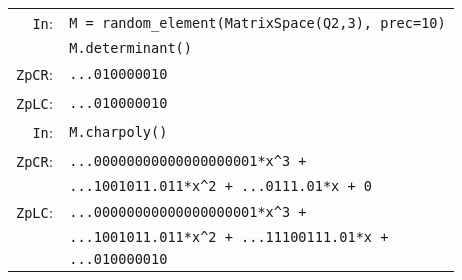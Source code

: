 \documentclass[sigconf]{acmart}
\newcommand{\cIn}{{\color{input} \tt \phantom{Zp}In}:}
\newcommand{\cZpCR}{{\color{output} \tt ZpCR}:}
\newcommand{\cZpFP}{{\color{output} \tt ZpFP}:}
\newcommand{\cZpLC}{{\color{output} \tt ZpLC}:}
\newcommand{\cZpLF}{{\color{output} \tt ZpLF}:}
\theoremstyle{definition}
\begin{document}
\smallskip

{\noindent \small
\begin{tabular}{rl}
\cIn
 & \verb?M = ?{\color{function}\verb?random_element?}\verb?(?{\color{constructor}\verb?MatrixSpace?}\verb?(?{\color{ring}\verb?Q2?}\verb?,3), prec=10)? \\
 & \verb?M.?{\color{method}\verb?determinant?}\verb?()? \\
\cZpCR
 & \verb?...010000010? \\
\cZpLC
 & \verb?...010000010? \\
\cIn
 & \verb?M.?{\color{method}\verb?charpoly?}\verb?()? \\
\cZpCR
 & \verb?...00000000000000000001*x^3 + ? \\
 & \verb?...1001011.011*x^2 + ...0111.01*x + 0? \\
\cZpLC
 & \verb?...00000000000000000001*x^3 + ? \\
 & \verb?...1001011.011*x^2 + ...11100111.01*x +? \\
 & \verb?...010000010? \\
\end{tabular}}

\end{document}
